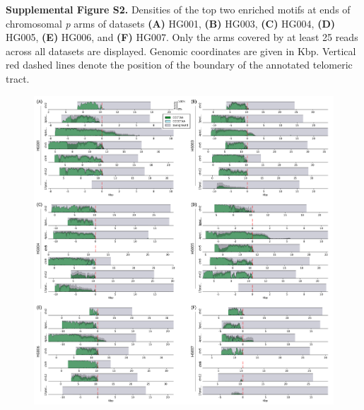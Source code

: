 \documentclass{article}
\begin{document}

\begin{samepage}
\noindent \textbf{Supplemental Figure S2.}
Densities of the top two enriched motifs at ends of chromosomal \textit{p} arms of datasets
\textbf{(A)} HG001,
\textbf{(B)} HG003,
\textbf{(C)} HG004,
\textbf{(D)} HG005,
\textbf{(E)} HG006, and
\textbf{(F)} HG007.
Only the arms covered by at least 25 reads across all datasets are displayed.
Genomic coordinates are given in Kbp.
Vertical red dashed lines denote the position of the boundary of the annotated telomeric tract.

\begin{figure}[ht!] \centering
\includegraphics[width=\textwidth,keepaspectratio]{Figure_S2-nolegend.pdf}
\end{figure}
\end{samepage}
\end{document}
